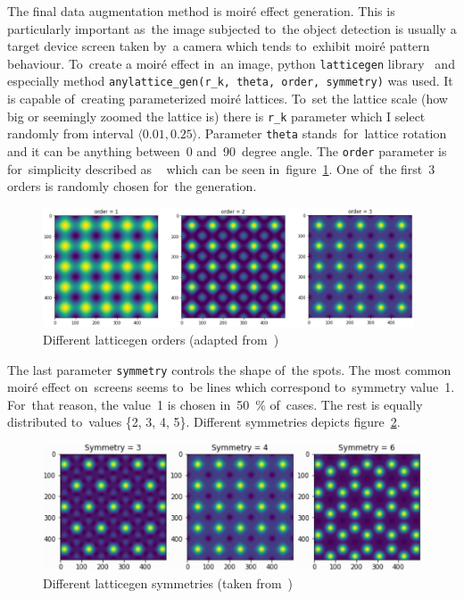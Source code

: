 The final data augmentation method is moiré effect generation. This is particularly \hbox{important} as~the image subjected to~the object detection is usually a target device screen taken by~a camera which tends to~exhibit moiré pattern behaviour. To~create a moiré effect in~an image, python \texttt{latticegen} library~\cite{latticegen} and especially method \texttt{anylattice\_gen(r\_k, theta, order, symmetry)} was used. It is capable of~creating parameterized moiré lattices. To~set the lattice scale (how big or seemingly zoomed the lattice is) there is \texttt{r\_k} \hbox{parameter} which I select randomly from interval \(\langle0.01, 0.25\rangle\). Parameter \texttt{theta} stands~for~\hbox{lattice} \hbox{rotation} and it can be anything between~0 and~90~degree angle. The \texttt{order} parameter is for~simplicity described as ~\cite{latticegen} which can be seen in~figure~\ref{latticegen-order}. One of~the first~3 orders is randomly chosen for~the generation.

\begin{figure}[hbt]
    \centering
    \includegraphics[width=0.98\textwidth]{img/dataset/latticegen-order.png}
    \caption{Different latticegen orders (adapted from~\cite{latticegen})}
    \label{latticegen-order}
\end{figure}

The last parameter \texttt{symmetry} controls the shape of~the spots. The most common moiré effect on~screens seems to~be lines which correspond to~symmetry value~1. For~that reason, the value~1 is chosen in~50~\% of~cases. The rest is equally distributed to~values \{2, 3, 4, 5\}. Different symmetries depicts figure~\ref{latticegen-symmetry}.

\begin{figure}[hbt]
    \includegraphics[width=1\textwidth]{img/dataset/latticegen-symmetry.png}
    \caption{Different latticegen symmetries (taken from~\cite{latticegen})}
    \label{latticegen-symmetry}
\end{figure}

